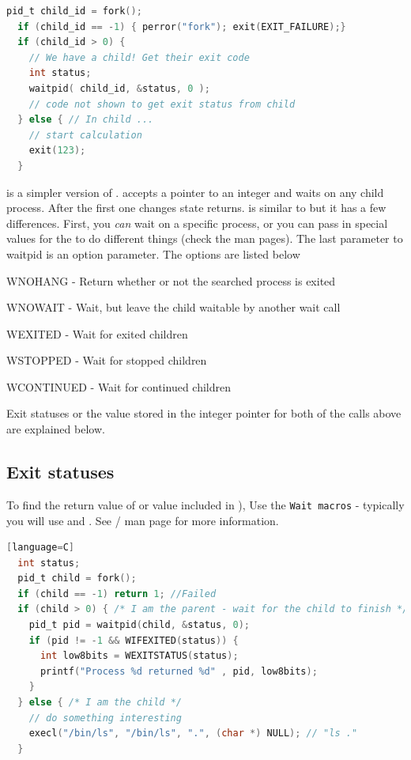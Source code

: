 \begin{lstlisting}[language=C]
  pid_t child_id = fork();
  if (child_id == -1) { perror("fork"); exit(EXIT_FAILURE);}
  if (child_id > 0) {
    // We have a child! Get their exit code
    int status;
    waitpid( child_id, &status, 0 );
    // code not shown to get exit status from child
  } else { // In child ...
    // start calculation
    exit(123);
  }
\end{lstlisting}

 is a simpler version of .
 accepts a pointer to an integer and waits on any child process.
After the first one changes state  returns.
 is similar to  but it has a few differences.
First, you \textit{can} wait on a specific process, or you can pass in special values for the  to do different things (check the man pages).
The last parameter to waitpid is an option parameter.
The options are listed below


\begin{enunmerate}
\item WNOHANG - Return whether or not the searched process is exited
\item WNOWAIT - Wait, but leave the child waitable by another wait call
\item WEXITED - Wait for exited children
\item WSTOPPED - Wait for stopped children
\item WCONTINUED - Wait for continued children
\end{enunmerate}

Exit statuses or the value stored in the integer pointer for both of the calls above are explained below.

\subsection{Exit statuses}

To find the return value of  or value included in ), Use the \texttt{Wait macros} - typically you will use  and  .
See / man page for more information.

\begin{lstlisting}[language=C][language=C]
  int status;
  pid_t child = fork();
  if (child == -1) return 1; //Failed
  if (child > 0) { /* I am the parent - wait for the child to finish */
    pid_t pid = waitpid(child, &status, 0);
    if (pid != -1 && WIFEXITED(status)) {
      int low8bits = WEXITSTATUS(status);
      printf("Process %d returned %d" , pid, low8bits);
    }
  } else { /* I am the child */
    // do something interesting
    execl("/bin/ls", "/bin/ls", ".", (char *) NULL); // "ls ."
  }
\end{lstlisting}

